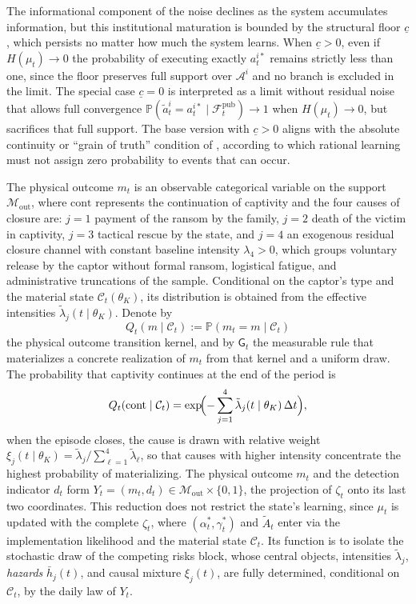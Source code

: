 \documentclass[review,authoryear,12pt]{elsarticle}
\theoremstyle{plain}
\theoremstyle{definition}
\newcommand{\Prob}{\mathbb{P}}
\newcommand{\1}{\mathbf{1}}
\begin{document}
The informational component of the noise declines as the system accumulates information, but this institutional maturation is bounded by the structural floor $\underline{c}$, which persists no matter how much the system learns. When $\underline{c}>0$, even if $H(\mu_t)\to 0$ the probability of executing exactly $a_t^{i\ast}$ remains strictly less than one, since the floor preserves full support over $\mathcal{A}^i$ and no branch is excluded in the limit. The special case $\underline{c}=0$ is interpreted as a limit without residual noise that allows full convergence $\Prob(\tilde{a}_t^i=a_t^{i\ast}\mid\mathcal{F}_t^{\mathrm{pub}})\to 1$ when $H(\mu_t)\to 0$, but sacrifices that full support. The base version with $\underline{c}>0$ aligns with the absolute continuity or ``grain of truth'' condition of \citet{KalaiLehrer1993}, according to which rational learning must not assign zero probability to events that can occur.

The physical outcome $m_t$ is an observable categorical variable on the support $\mathcal{M}_{\mathrm{out}}$, where $\mathrm{cont}$ represents the continuation of captivity and the four causes of closure are: $j=1$ payment of the ransom by the family, $j=2$ death of the victim in captivity, $j=3$ tactical rescue by the state, and $j=4$ an exogenous residual closure channel with constant baseline intensity $\lambda_4>0$, which groups voluntary release by the captor without formal ransom, logistical fatigue, and administrative truncations of the sample. Conditional on the captor's type and the material state $\mathcal{C}_t(\theta_K)$, its distribution is obtained from the effective intensities $\tilde{\lambda}_j(t\mid\theta_K)$. Denote by
\[
Q_t(m\mid\mathcal{C}_t):=\Prob(m_t=m\mid\mathcal{C}_t)
\]
the physical outcome transition kernel, and by $\mathsf{G}_t$ the measurable rule that materializes a concrete realization of $m_t$ from that kernel and a uniform draw. The probability that captivity continues at the end of the period is
\[
Q_t(\mathrm{cont}\mid\mathcal{C}_t)=\exp\!\Bigl(-\sum_{j=1}^{4}\tilde{\lambda}_j(t\mid\theta_K)\,\Delta t\Bigr),
\]
when the episode closes, the cause is drawn with relative weight $\xi_j(t\mid\theta_K)=\tilde{\lambda}_j/\sum_{\ell=1}^{4}\tilde{\lambda}_\ell$, so that causes with higher intensity concentrate the highest probability of materializing. The physical outcome $m_t$ and the detection indicator $d_t$ form $Y_t=(m_t,d_t)\in\mathcal{M}_{\mathrm{out}}\times\{0,1\}$, the projection of $\zeta_t$ onto its last two coordinates. This reduction does not restrict the state's learning, since $\mu_t$ is updated with the complete $\zeta_t$, where $(\alpha_t^\ast,\gamma_t^\ast)$ and $\tilde{A}_t$ enter via the implementation likelihood and the material state $\mathcal{C}_t$. Its function is to isolate the stochastic draw of the competing risks block, whose central objects, intensities $\tilde{\lambda}_j$, \textit{hazards} $\bar{h}_j(t)$, and causal mixture $\xi_j(t)$, are fully determined, conditional on $\mathcal{C}_t$, by the daily law of $Y_t$.
\end{document}

